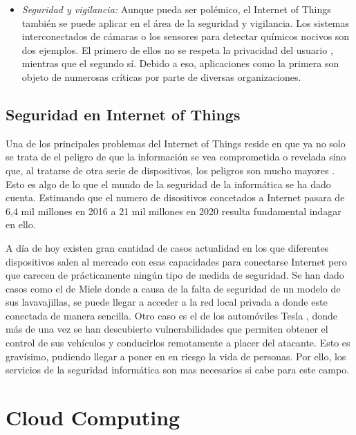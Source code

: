 \begin{itemize}
	\item \emph{Seguridad y vigilancia:} Aunque pueda ser polémico, el Internet of Things también se puede aplicar en el área de la seguridad y vigilancia. Los sistemas interconectados de cámaras o los sensores para detectar químicos nocivos son dos ejemplos. El primero de ellos no se respeta la privacidad del usuario , mientras que el segundo sí. Debido a eso, aplicaciones como la primera son objeto de numerosas críticas por parte de diversas organizaciones.
	
\end{itemize}

\subsection{Seguridad en Internet of Things}

Una de los principales problemas del Internet of Things reside en que ya no solo se trata de el peligro de que la información se vea comprometida o revelada sino que, al tratarse de otra serie de dispositivos, los peligros son mucho mayores \cite{iot-qz}\cite{iot-techradar}. Esto es algo de lo que el mundo de la seguridad de la informática se ha dado cuenta. Estimando que el numero de disositivos concetados a Internet pasara de 6,4 mil millones en 2016 a 21 mil millones en 2020 \cite{iot-searchdatacenter} resulta fundamental indagar en ello. 

A día de hoy existen gran cantidad de casos actualidad en los que diferentes dispositivos salen al mercado con esas capacidades para conectarse Internet pero que carecen de prácticamente ningún tipo de medida de seguridad. Se han dado casos como el de Miele\cite{iot-miele} donde a causa de la falta de seguridad de un modelo de sus lavavajillas, se puede llegar a acceder a la red local privada a donde este conectada de manera sencilla. Otro caso es el de los automóviles Tesla \cite{iot-tesla}, donde más de una vez se han descubierto vulnerabilidades que permiten obtener el control de sus vehículos y conducirlos remotamente a placer del atacante. Esto es gravísimo, pudiendo llegar a poner en en riesgo la vida de personas. Por ello, los servicios de la seguridad informática son mas necesarios si cabe para este campo. 



\section{Cloud Computing}


